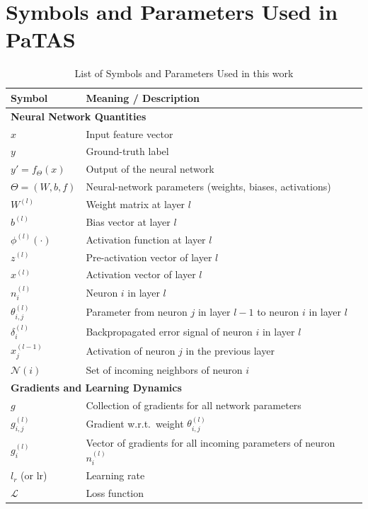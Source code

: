 \section{Symbols and Parameters Used in PaTAS}\label{app:symbols}
\begin{table}[H]
\centering
\caption{List of Symbols and Parameters Used in this work}
\label{tab:params-appendix}
\label{tab:params-full}
\renewcommand{\arraystretch}{1.2}
\begin{tabular}{ll}
\hline
\textbf{Symbol} & \textbf{Meaning / Description} \\
\hline
\multicolumn{2}{l}{\textbf{Neural Network Quantities}} \\
$x$ & Input feature vector \\
$y$ & Ground-truth label \\
$y' = f_\Theta(x)$ & Output of the neural network \\
$\Theta = (W,b,f)$ & Neural-network parameters (weights, biases, activations) \\
$W^{(l)}$ & Weight matrix at layer $l$ \\
$b^{(l)}$ & Bias vector at layer $l$ \\
$\phi^{(l)}(\cdot)$ & Activation function at layer $l$ \\
$z^{(l)}$ & Pre-activation vector of layer $l$ \\
$x^{(l)}$ & Activation vector of layer $l$ \\
$n_i^{(l)}$ & Neuron $i$ in layer $l$ \\
$\theta^{(l)}_{i,j}$ & Parameter from neuron $j$ in layer $l\!-\!1$ to neuron $i$ in layer $l$ \\
$\delta^{(l)}_i$ & Backpropagated error signal of neuron $i$ in layer $l$ \\
$x^{(l-1)}_j$ & Activation of neuron $j$ in the previous layer \\
$\mathcal{N}(i)$ & Set of incoming neighbors of neuron $i$ \\[4pt]

\multicolumn{2}{l}{\textbf{Gradients and Learning Dynamics}} \\
$g$ & Collection of gradients for all network parameters \\
$g^{(l)}_{i,j}$ & Gradient w.r.t.\ weight $\theta^{(l)}_{i,j}$ \\
$g^{(l)}_i$ & Vector of gradients for all incoming parameters of neuron $n_i^{(l)}$ \\
$l_r$ (or $\mathrm{lr}$) & Learning rate \\
$\mathcal{L}$ & Loss function \\[4pt]


\end{tabular}
\end{table}
